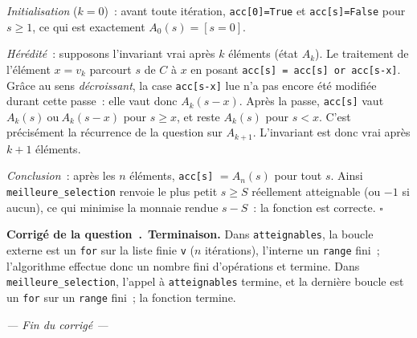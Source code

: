 \documentclass[11pt,a4paper]{article}
\newcounter{qcnt}
\newcommand{\Q}{\medskip\par\stepcounter{qcnt}\noindent\textbf{Corrigé de la question~\theqcnt.}~}
\newcommand{\code}[1]{\lstinline!#1!}
\begin{document}
\emph{Initialisation} ($k=0$)~: avant toute itération, \code{acc[0]=True} et \code{acc[s]=False} pour $s\ge 1$, ce qui est exactement $A_0(s) = [s=0]$.

\emph{Hérédité}~: supposons l'invariant vrai après $k$ éléments (état $A_k$). Le traitement de l'élément $x = v_k$ parcourt $s$ de $C$ à $x$ en posant \code{acc[s] = acc[s] or acc[s-x]}. Grâce au sens \emph{décroissant}, la case \code{acc[s-x]} lue n'a pas encore été modifiée durant cette passe~: elle vaut donc $A_k(s-x)$. Après la passe, \code{acc[s]} vaut $A_k(s)\ \text{ou}\ A_k(s-x)$ pour $s\ge x$, et reste $A_k(s)$ pour $s<x$. C'est précisément la récurrence de la question sur $A_{k+1}$. L'invariant est donc vrai après $k+1$ éléments.

\emph{Conclusion}~: après les $n$ éléments, \code{acc[s]} $= A_n(s)$ pour tout $s$. Ainsi \code{meilleure_selection} renvoie le plus petit $s\ge S$ réellement atteignable (ou $-1$ si aucun), ce qui minimise la monnaie rendue $s-S$~: la fonction est correcte. \hfill$\square$

\Q \textbf{Terminaison.} Dans \code{atteignables}, la boucle externe est un \code{for} sur la liste finie \code{v} ($n$ itérations), l'interne un \code{range} fini~; l'algorithme effectue donc un nombre fini d'opérations et termine. Dans \code{meilleure_selection}, l'appel à \code{atteignables} termine, et la dernière boucle est un \code{for} sur un \code{range} fini~; la fonction termine.

\vfill
\begin{center}\small\itshape --- Fin du corrigé ---\end{center}
\end{document}
